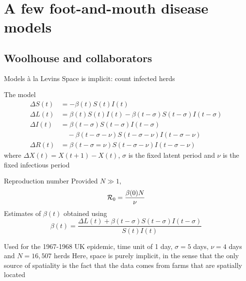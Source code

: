 \documentclass[aspectratio=43]{beamer}
\begin{document}
\section{A few foot-and-mouth disease models}

\subsection{Woolhouse and collaborators}
\begin{frame}{Models \`a la Levins}
    Space is implicit: count infected herds
\end{frame}


\begin{frame}{The model}
	\begin{subequations}
		\begin{align}
			\Delta S(t) &= -\beta(t)S(t)I(t) \\
			\Delta L(t) &= \beta(t)S(t)I(t) -\beta(t-\sigma)S(t-\sigma)I(t-\sigma) \\
			\Delta I(t) &= \beta(t-\sigma)S(t-\sigma)I(t-\sigma) \nonumber \\
			&\quad -\beta(t-\sigma-\nu)S(t-\sigma-\nu)I(t-\sigma-\nu) \\
			\Delta R(t) &= \beta(t-\sigma=\nu)S(t-\sigma-\nu)I(t-\sigma-\nu)
		\end{align}
	\end{subequations}
	where $\Delta X(t)=X(t+1)-X(t)$, $\sigma$ is the fixed latent period and $\nu$ is the fixed infectious period
\end{frame}

\begin{frame}{Reproduction number}
	Provided $N\gg 1$, 
	\[
		\mathcal{R}_0=\frac{\beta(0)N}{\nu}
	\]
	\vfill
	Estimates of $\beta(t)$ obtained using
	\[
		\beta(t)=\frac{\Delta L(t)+\beta(t-\sigma)S(t-\sigma)I(t-\sigma)}{S(t)I(t)}
	\]
\end{frame}

\begin{frame}
	Used for the 1967-1968 UK epidemic, time unit of 1 day, $\sigma=5$ days, $\nu=4$ days and $N=16,507$ herds
	\vfill
	Here, space is purely implicit, in the sense that the only source of spatiality is the fact that the data comes from farms that are spatially located
\end{frame}
\end{document}
